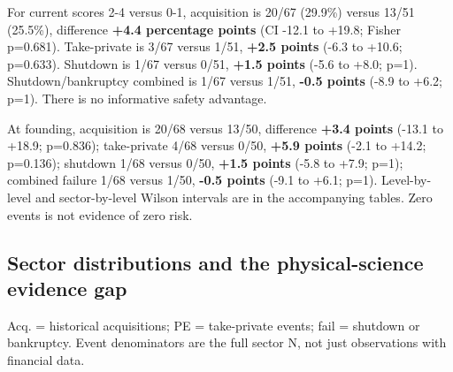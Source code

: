 \documentclass{article}
\begin{document}
For current scores 2-4 versus 0-1, acquisition is 20/67 (29.9\%) versus
13/51 (25.5\%), difference \textbf{+4.4 percentage points} (CI -12.1 to
+19.8; Fisher p=0.681). Take-private is 3/67 versus 1/51, \textbf{+2.5
points} (-6.3 to +10.6; p=0.633). Shutdown is 1/67 versus 0/51,
\textbf{+1.5 points} (-5.6 to +8.0; p=1). Shutdown/bankruptcy combined
is 1/67 versus 1/51, \textbf{-0.5 points} (-8.9 to +6.2; p=1). There is
no informative safety advantage.

At founding, acquisition is 20/68 versus 13/50, difference \textbf{+3.4
points} (-13.1 to +18.9; p=0.836); take-private 4/68 versus 0/50,
\textbf{+5.9 points} (-2.1 to +14.2; p=0.136); shutdown 1/68 versus
0/50, \textbf{+1.5 points} (-5.8 to +7.9; p=1); combined failure 1/68
versus 1/50, \textbf{-0.5 points} (-9.1 to +6.1; p=1). Level-by-level
and sector-by-level Wilson intervals are in the accompanying tables.
Zero events is not evidence of zero risk.

\subsection{Sector distributions and the physical-science evidence
gap}\label{sector-distributions-and-the-physical-science-evidence-gap}

Acq. = historical acquisitions; PE = take-private events; fail =
shutdown or bankruptcy. Event denominators are the full sector N, not
just observations with financial data.
\end{document}

